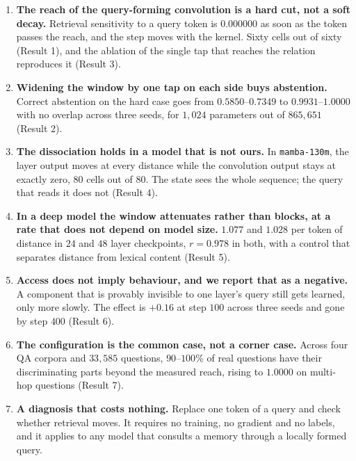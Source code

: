 \documentclass[10pt]{article}
\begin{document}
\begin{enumerate}
\item \textbf{The reach of the query-forming convolution is a hard cut, not a soft decay.} Retrieval
sensitivity to a query token is $0.000000$ as soon as the token passes the reach, and the step moves
with the kernel. Sixty cells out of sixty (Result 1), and the ablation of the single tap that reaches
the relation reproduces it (Result 3).

\item \textbf{Widening the window by one tap on each side buys abstention.} Correct abstention on the
hard case goes from $0.5850$--$0.7349$ to $0.9931$--$1.0000$ with no overlap across three seeds, for
$1{,}024$ parameters out of $865{,}651$ (Result 2).

\item \textbf{The dissociation holds in a model that is not ours.} In \texttt{mamba-130m}, the layer
output moves at every distance while the convolution output stays at exactly zero, $80$ cells out of
$80$. The state sees the whole sequence; the query that reads it does not (Result 4).

\item \textbf{In a deep model the window attenuates rather than blocks, at a rate that does not depend
on model size.} $1.077$ and $1.028$ per token of distance in $24$ and $48$ layer checkpoints,
$r = 0.978$ in both, with a control that separates distance from lexical content (Result 5).

\item \textbf{Access does not imply behaviour, and we report that as a negative.} A component that is
provably invisible to one layer's query still gets learned, only more slowly. The effect is
$+0.16$ at step $100$ across three seeds and gone by step $400$ (Result 6).

\item \textbf{The configuration is the common case, not a corner case.} Across four QA corpora and
$33{,}585$ questions, $90$--$100\%$ of real questions have their discriminating parts beyond the
measured reach, rising to $1.0000$ on multi-hop questions (Result 7).

\item \textbf{A diagnosis that costs nothing.} Replace one token of a query and check whether
retrieval moves. It requires no training, no gradient and no labels, and it applies to any model that
consults a memory through a locally formed query.
\end{enumerate}
\end{document}
